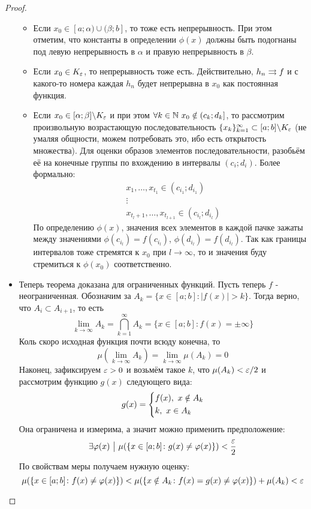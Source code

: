 \begin{proof}
\begin{itemize}
\begin{itemize}
			\item Если $x_0 \in [a; \alpha) \cup (\beta; b]$, то тоже есть непрерывность. При этом отметим, что константы в определении $\phi(x)$ должны быть подогнаны под левую непрерывность в $\alpha$ и правую непрерывность в $\beta$.
			
			\item Если $x_0 \in K_\varepsilon$, то непрерывность тоже есть. Действительно, $h_n \rightrightarrows f$ и с какого-то номера каждая $h_n$ будет непрерывна в $x_0$ как постоянная функция.
			
			\item Если $x_0 \in [\alpha; \beta] \backslash K_\varepsilon$ и при этом $\forall k \in \N\ x_0 \notin (c_k; d_k]$, то рассмотрим произвольную возрастающую последовательность $\{x_k\}_{k = 1}^\infty \subset [a; b] \backslash K_\varepsilon$ (не умаляя общности, можем потребовать это, ибо есть открытость множества). Для оценки образов элементов последовательности, разобьём её на конечные группы по вхождению в интервалы $(c_i; d_i)$. Более формально:
			\begin{align*}
				&{x_1, \ldots, x_{t_1} \in (c_{i_1}; d_{i_1})}
				\\
				&{\vdots}
				\\
				&{x_{t_l + 1}, \ldots, x_{t_{l + 1}} \in (c_{i_l}; d_{i_l})}
			\end{align*}
			По определению $\phi(x)$, значения всех элементов в каждой пачке зажаты между значениями $\phi(c_{i_l}) = f(c_{i_l})$, $\phi(d_{i_l}) = f(d_{i_l})$. Так как границы интервалов тоже стремятся к $x_0$ при $l \to \infty$, то и значения буду стремиться к $\phi(x_0)$ соответственно.
		\end{itemize}
		
		\item Теперь теорема доказана для ограниченных функций. Пусть теперь $f$ - неограниченная. Обозначим за $A_k = \{x \in [a; b] \colon |f(x)| > k\}$. Тогда верно, что $A_i \subset A_{i + 1}$, то есть
		\[
			\lim_{k \to \infty} A_k = \bigcap_{k = 1}^\infty A_k = \{x \in [a; b] \colon f(x) = \pm\infty\}
		\]
		Коль скоро исходная функция почти всюду конечна, то
		\[
			\mu(\lim_{k \to \infty} A_k) = \lim_{k \to \infty} \mu(A_k) = 0
		\]
		Наконец, зафиксируем $\varepsilon > 0$ и возьмём такое $k$, что $\mu(A_k) < \varepsilon / 2$ и рассмотрим функцию $g(x)$ следующего вида:
		\[
			g(x) = \left\{\begin{aligned}
				&{f(x),\ x \notin A_k}
				\\
				&{k,\ x \in A_k}
			\end{aligned}\right.
		\]
		Она ограничена и измерима, а значит можно применить предположение:
		\[
			\exists \varphi(x) \ \big|\  \mu(\{x \in [a; b] \colon g(x) \neq \varphi(x)\}) < \frac{\varepsilon}{2}
		\]
		По свойствам меры получаем нужную оценку:
		\[
			\mu(\{x \in [a; b] \colon f(x) \neq \varphi(x)\}) < \mu(\{x \notin A_k \colon f(x) = g(x) \neq \varphi(x)\}) + \mu(A_k) < \varepsilon
		\]
	\end{itemize}
\end{proof}